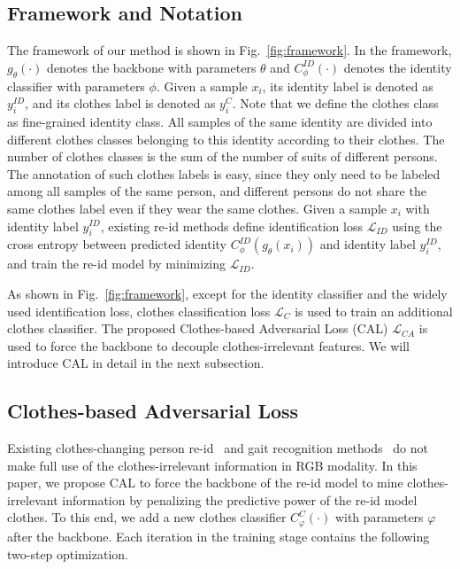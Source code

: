 \documentclass[10pt,twocolumn,letterpaper]{article}
\begin{document}
\subsection{Framework and Notation}
The framework of our method is shown in Fig.~\ref{fig:framework}.
In the framework, $g_{\theta}(\cdot)$ denotes the backbone with parameters $\theta$ and $C^{ID}_{\phi}(\cdot)$ denotes the identity classifier with parameters $\phi$.
Given a sample $x_i$, its identity label is denoted as $y^{ID}_i$, and its clothes label is denoted as $y^{C}_i$.
Note that we define the clothes class as fine-grained identity class.
All samples of the same identity are divided into different clothes classes belonging to this identity according to their clothes.
The number of clothes classes is the sum of the number of suits of different persons.
The annotation of such clothes labels is easy, since they only need to be labeled among all samples of the same person, and different persons do not share the same clothes label even if they wear the same clothes.
Given a sample $x_i$ with identity label $y^{ID}_i$, existing re-id methods \cite{Sun2018Beyond, Hou2019Interaction} define identification loss $\mathcal{L}_{ID}$ using the cross entropy between predicted identity $C^{ID}_{\phi}(g_{\theta}(x_i))$ and identity label $y^{ID}_i$, and train the re-id model by minimizing $\mathcal{L}_{ID}$.

As shown in Fig.~\ref{fig:framework}, except for the identity classifier and the widely used identification loss, clothes classification loss $\mathcal{L}_{C}$ is used to train an additional clothes classifier.
The proposed Clothes-based Adversarial Loss (CAL) $\mathcal{L}_{CA}$ is used to force the backbone to decouple clothes-irrelevant features.
We will introduce CAL in detail in the next subsection.

\subsection{Clothes-based Adversarial Loss}
\label{sec:CAL}
Existing clothes-changing person re-id~\cite{Yang2019PRCC, Qian2020LTCC} and gait recognition methods~\cite{Yang2016Learning, Chao2019Gaitset} do not make full use of the clothes-irrelevant information in RGB modality.
In this paper, we propose CAL to force the backbone of the re-id model to mine clothes-irrelevant information by penalizing the predictive power of the re-id model \wrt clothes.
To this end, we add a new clothes classifier $C^{C}_{\varphi}(\cdot)$ with parameters $\varphi$ after the backbone. Each iteration in the training stage contains the following two-step optimization.
\end{document}
